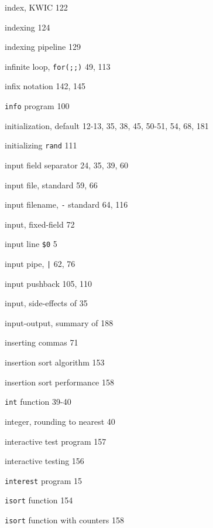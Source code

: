 \begin{multicols}{3}
\hangindent=4pc  index, KWIC 122

\hangindent=4pc  indexing 124

\hangindent=4pc  indexing pipeline 129

\hangindent=4pc  infinite loop, \verb'for(;;)' 49, 113

\hangindent=4pc  infix notation 142, 145

\hangindent=4pc  \verb'info' program 100

\hangindent=4pc  initialization, default 12-13, 35, 38, 45, 50-51, 54, 68, 181

\hangindent=4pc  initializing \verb'rand' 111

\hangindent=4pc  input field separator 24, 35, 39, 60

\hangindent=4pc  input file, standard 59, 66

\hangindent=4pc  input filename, \verb'-' standard 64, 116

\hangindent=4pc  input, fixed-field 72

\hangindent=4pc  input line \verb'$0' 5

\hangindent=4pc  input pipe, \verb'|' 62, 76

\hangindent=4pc  input pushback 105, 110

\hangindent=4pc  input, side-effects of 35

\hangindent=4pc  input-output, summary of 188

\hangindent=4pc  inserting commas 71

\hangindent=4pc  insertion sort algorithm 153

\hangindent=4pc  insertion sort performance 158

\hangindent=4pc  \verb'int' function 39-40

\hangindent=4pc  integer, rounding to nearest 40

\hangindent=4pc  interactive test program 157

\hangindent=4pc  interactive testing 156

\hangindent=4pc  \verb'interest' program 15 

\hangindent=4pc  \verb'isort' function 154

\hangindent=4pc  \verb'isort' function with counters 158


\end{multicols}
